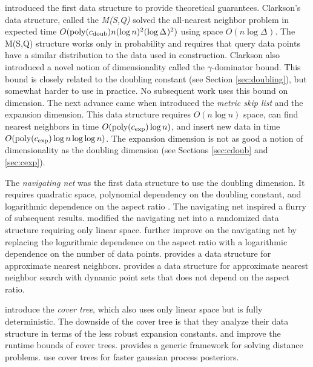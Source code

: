 \documentclass[../main.tex]{subfiles}
\newcommand{\aspect}[1]{\Delta_{#1}}
\newcommand{\cexp}{c_\textnormal{exp}}
\newcommand{\cdoub}{c_\textnormal{doub}}
\newcommand{\poly}[1]{\text{poly}(#1)}
\begin{document}
\cite{clarkson1997nearest} introduced the first data structure to provide theoretical guarantees.
Clarkson's data structure, called the \emph{M(S,Q)} solved the all-nearest neighbor problem in expected time $O(\poly{\cdoub}n(\log n)^2(\log \aspect{})^2)$ using space $O(n\log\aspect{})$.
The M(S,Q) structure works only in probability
and requires that query data points have a similar distribution to the data used in construction.
Clarkson also introduced a novel notion of dimensionality called the $\gamma$-dominator bound.
This bound is closely related to the doubling constant (see Section \ref{sec:doubling}),
but somewhat harder to use in practice.
No subsequent work uses this bound on dimension.
The next advance came when \citet{karger2002finding} introduced the \emph{metric skip list} and the expansion dimension. 
This data structure requires $O(n\log n)$ space, 
can find nearest neighbors in time $O(\poly\cexp\log n)$,
and insert new data in time $O(\poly\cexp\log n \log \log n)$.
The expansion dimension is not as good a notion of dimensionality as the doubling dimension
(see Sections \ref{sec:cdoub} and \ref{sec:cexp}).

The \emph{navigating net} was the first data structure to use the doubling dimension.
It requires quadratic space, 
polynomial dependency on the doubling constant, 
and logarithmic dependence on the aspect ratio \citep{krauthgamer2004navigating}.
The navigating net inspired a flurry of subsequent results.
\citet{hildrum2004note} modified the navigating net into a randomized data structure requiring only linear space.
\cite{krauthgamer2005black} further improve on the navigating net by replacing the logarithmic dependence on the aspect ratio with a logarithmic dependence on the number of data points.
\cite{har2006fast} provides a data structure for approximate nearest neighbors.
\cite{cole2006searching} provides a data structure for approximate nearest neighbor search with dynamic point sets that does not depend on the aspect ratio.

\citet{beygelzimer2006cover} introduce the \emph{cover tree},
which also uses only linear space but is fully deterministic.
The downside of the cover tree is that they analyze their data structure in terms of the less robust expansion constants.
\cite{ram2009linear} and \cite{curtin2015plug} improve the runtime bounds of cover trees.
\cite{curtin2013tree} provides a generic framework for solving distance problems.
\cite{moore2014fast} use cover trees for faster gaussian process posteriors.
\end{document}
